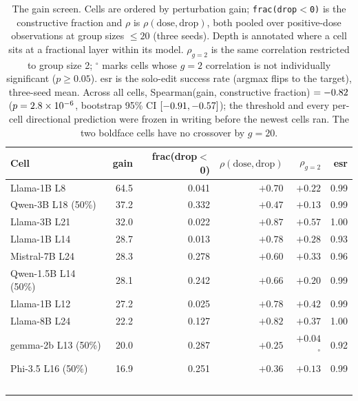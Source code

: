 \documentclass[preprint,12pt]{elsarticle}
\begin{document}
\begin{table}[t]
\centering
\caption{The gain screen. Cells are ordered by perturbation gain; \texttt{frac(drop$<$0)}
is the constructive fraction and $\rho$ is $\rho(\mathrm{dose},\mathrm{drop})$, both
pooled over positive-dose observations at group sizes $\leq 20$ (three seeds). Depth is
annotated where a cell sits at a fractional layer within its model. $\rho_{g=2}$ is
the same correlation restricted to group size 2; $^{\circ}$ marks cells whose
$g{=}2$ correlation is not individually significant ($p\geq0.05$). esr is the
solo-edit success rate (argmax flips to the target), three-seed mean.
Across all \nCells{} cells, Spearman(gain, constructive fraction) $=\ordSpearman{}$
($p=\ordSpearmanP{}$, bootstrap 95\% CI $\ordSpearmanCI{}$); the
threshold and every per-cell directional prediction were frozen in writing before the newest
cells ran. The two boldface cells have no crossover by $g{=}20$.}
\label{tab:gain}
{\small
\begin{tabular}{lrrrrr}
\toprule
Cell & gain & frac(drop$<$0) & $\rho(\mathrm{dose},\mathrm{drop})$ & $\rho_{g=2}$ & esr \\
\midrule
Llama-1B L8         & 64.5 & 0.041 & $+0.70$ & $+0.22$ & 0.99 \\
Qwen-3B L18 (50\%)  & 37.2 & 0.332 & $+0.47$ & $+0.13$ & 0.99 \\
Llama-3B L21        & 32.0 & 0.022 & $+0.87$ & $+0.57$ & 1.00 \\
Llama-1B L14        & 28.7 & 0.013 & $+0.78$ & $+0.28$ & 0.93 \\
Mistral-7B L24      & 28.3 & 0.278 & $+0.60$ & $+0.33$ & 0.96 \\
Qwen-1.5B L14 (50\%)& 28.1 & 0.242 & $+0.66$ & $+0.20$ & 0.99 \\
Llama-1B L12        & 27.2 & 0.025 & $+0.78$ & $+0.42$ & 0.99 \\
Llama-8B L24        & 22.2 & 0.127 & $+0.82$ & $+0.37$ & 1.00 \\
gemma-2b L13 (50\%) & 20.0 & 0.287 & $+0.25$ & $+0.04$$^{\circ}$ & 0.92 \\
Phi-3.5 L16 (50\%)  & 16.9 & 0.251 & $+0.36$ & $+0.13$ & 0.99 \\
$$
\end{tabular}}
\end{table}
\end{document}
